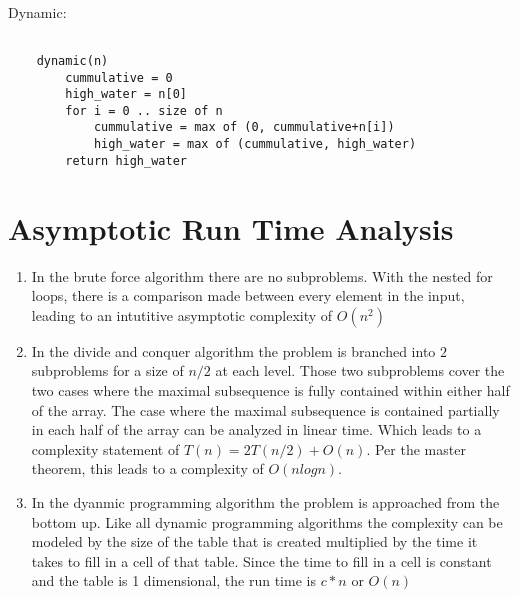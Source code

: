 \documentclass[12pt]{article}
\begin{document}
\paragraph{}
Dynamic:
    \begin{lstlisting}[basicstyle=\ttfamily\small,mathescape]

    dynamic(n)
        cummulative = 0
        high_water = n[0]
        for i = 0 .. size of n
            cummulative = max of (0, cummulative+n[i])
            high_water = max of (cummulative, high_water)
        return high_water

    \end{lstlisting}

\section{Asymptotic Run Time Analysis}
    \begin{enumerate}

    \item In the brute force algorithm there are no subproblems.  With the
            nested for loops, there is a comparison made between every element
            in the input, leading to an intutitive asymptotic complexity of 
            $O(n^2)$

	\item In the divide and conquer algorithm the problem is branched into 
            $2$ subproblems for a size of $n/2$ at each level.  Those two
            subproblems cover the two cases where the maximal subsequence
            is fully contained within either half of the array.  The case
            where the maximal subsequence is contained partially in each
            half of the array can be analyzed in linear time.  Which leads
            to a complexity statement of $T(n) = 2T(n/2) + O(n)$.  Per the
            master theorem, this leads to a complexity of $O(n log n)$.

    \item In the dyanmic programming algorithm the problem is approached 
            from the bottom up. Like all dynamic programming algorithms
            the complexity can be modeled by the size of the table that is
            created multiplied by the time it takes to fill in a cell of that
            table.  Since the time to fill in a cell is constant and the table
            is 1 dimensional, the run time is $c*n$ or $O(n)$   
     \end{enumerate}
\end{document}
